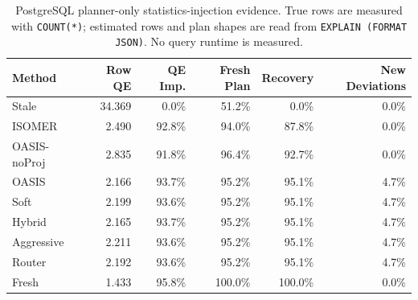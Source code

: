 \begin{table}[t]
  \centering
  \small
  \caption{PostgreSQL planner-only statistics-injection evidence. True rows are measured with \texttt{COUNT(*)}; estimated rows and plan shapes are read from \texttt{EXPLAIN (FORMAT JSON)}. No query runtime is measured.}
  \label{tab:postgres_planner_stats_injection}
  \setlength{\tabcolsep}{4pt}
  \begin{tabular}{lrrrrr}
    \toprule
    Method & Row QE & QE Imp. & Fresh Plan & Recovery & New Deviations \\
    \midrule
    Stale & 34.369 & 0.0\% & 51.2\% & 0.0\% & 0.0\% \\
    ISOMER & 2.490 & 92.8\% & 94.0\% & 87.8\% & 0.0\% \\
    OASIS-noProj & 2.835 & 91.8\% & 96.4\% & 92.7\% & 0.0\% \\
    OASIS & 2.166 & 93.7\% & 95.2\% & 95.1\% & 4.7\% \\
    Soft & 2.199 & 93.6\% & 95.2\% & 95.1\% & 4.7\% \\
    Hybrid & 2.165 & 93.7\% & 95.2\% & 95.1\% & 4.7\% \\
    Aggressive & 2.211 & 93.6\% & 95.2\% & 95.1\% & 4.7\% \\
    Router & 2.192 & 93.6\% & 95.2\% & 95.1\% & 4.7\% \\
    Fresh & 1.433 & 95.8\% & 100.0\% & 100.0\% & 0.0\% \\
    \bottomrule
  \end{tabular}
\end{table}
